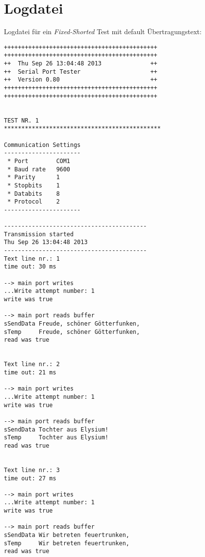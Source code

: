 \newpage
\section{Logdatei}\label{LogDatei}
Logdatei für ein \textit{Fixed-Shorted} Test mit default Übertragungstext:

\begin{lstlisting}
++++++++++++++++++++++++++++++++++++++++++++
++++++++++++++++++++++++++++++++++++++++++++
++  Thu Sep 26 13:04:48 2013              ++
++  Serial Port Tester                    ++
++  Version 0.80                          ++
++++++++++++++++++++++++++++++++++++++++++++
++++++++++++++++++++++++++++++++++++++++++++


TEST NR. 1
*********************************************

Communication Settings
----------------------
 * Port        COM1
 * Baud rate   9600
 * Parity      1
 * Stopbits    1
 * Databits    8
 * Protocol    2
----------------------

-----------------------------------------
Transmission started
Thu Sep 26 13:04:48 2013
-----------------------------------------
Text line nr.: 1
time out: 30 ms

--> main port writes
...Write attempt number: 1
write was true

--> main port reads buffer
sSendData Freude, schöner Götterfunken,
sTemp     Freude, schöner Götterfunken,
read was true


Text line nr.: 2
time out: 21 ms

--> main port writes
...Write attempt number: 1
write was true

--> main port reads buffer
sSendData Tochter aus Elysium!
sTemp     Tochter aus Elysium!
read was true


Text line nr.: 3
time out: 27 ms

--> main port writes
...Write attempt number: 1
write was true

--> main port reads buffer
sSendData Wir betreten feuertrunken,
sTemp     Wir betreten feuertrunken,
read was true



\end{lstlisting}
